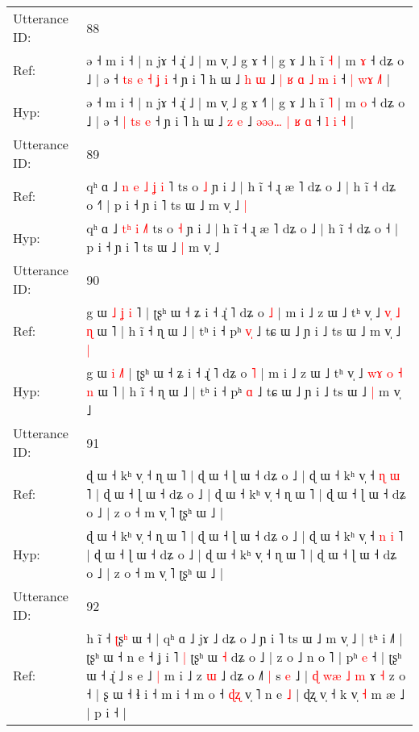 \documentclass[10pt]{article}
\DeclareRobustCommand{\hl}[1]{{\textcolor{red}{#1}}}
\begin{document}
\begin{longtable}{ll}
 \\
\midrule
Utterance ID: & 88 \\
Ref: & ə ˧ m i ˧ | n jɤ ˧ ɻ̍ ˩ | m v̩ ˩ g ɤ ˧\hl{} | g ɤ ˩ h ĩ \hl{˧} | m \hl{ɤ} ˧ dʑ o ˩ | ə ˧\hl{ }\hl{t}\hl{s} \hl{e} \hl{˧}\hl{ }\hl{ʝ} \hl{i} ˧ ɲ i ˥ h ɯ ˩ \hl{h} \hl{ɯ} ˩ \hl{|}\hl{ }\hl{ʁ}\hl{ }\hl{ɑ} \hl{˩} \hl{m} \hl{i} ˧ \hl{|} \hl{w}\hl{ɤ} \hl{˩}\hl{˥} |
 \\
Hyp: & ə ˧ m i ˧ | n jɤ ˧ ɻ̍ ˩ | m v̩ ˩ g ɤ ˧\hl{˥} | g ɤ ˩ h ĩ \hl{˥} | m \hl{o} ˧ dʑ o ˩ | ə ˧\hl{}\hl{}\hl{} \hl{|} \hl{}\hl{t}\hl{s} \hl{e} ˧ ɲ i ˥ h ɯ ˩ \hl{z} \hl{e} ˩ \hl{}\hl{ə}\hl{ə}\hl{ə}\hl{…} \hl{|} \hl{ʁ} \hl{ɑ} ˧ \hl{l} \hl{}\hl{i} \hl{}\hl{˧} |
 \\
\midrule
Utterance ID: & 89 \\
Ref: & qʰ ɑ ˩\hl{ }\hl{n} \hl{e}\hl{ }\hl{˩} \hl{ʝ} \hl{i}\hl{ }˥ ts o \hl{˩} ɲ i ˩ | h ĩ ˧ ɻ æ ˥ dʑ o ˩ | h ĩ ˧ dʑ o ˧\hl{˥} | p i ˧ ɲ i ˥ ts ɯ ˩\hl{}\hl{} m v̩ ˩\hl{ }\hl{|}
 \\
Hyp: & qʰ ɑ ˩\hl{}\hl{} \hl{}\hl{t}\hl{ʰ} \hl{i} \hl{}\hl{˩}˥ ts o \hl{˧} ɲ i ˩ | h ĩ ˧ ɻ æ ˥ dʑ o ˩ | h ĩ ˧ dʑ o ˧\hl{} | p i ˧ ɲ i ˥ ts ɯ ˩\hl{ }\hl{|} m v̩ ˩\hl{}\hl{}
 \\
\midrule
Utterance ID: & 90 \\
Ref: & g ɯ\hl{ }\hl{˩} \hl{ʝ} \hl{i}\hl{ }˥ | ʈʂʰ ɯ ˧ ʑ i ˧ ɻ̍ ˥ dʑ o \hl{˩} | m i ˩ z ɯ ˩ tʰ v̩ ˩ \hl{}\hl{}\hl{v}\hl{̩} \hl{˩} \hl{ɳ} ɯ ˥ | h ĩ ˧ ɳ ɯ ˩ | tʰ i ˧ pʰ \hl{v}\hl{̩} ˩ tɕ ɯ ˩ ɲ i ˩ ts ɯ ˩\hl{}\hl{} m v̩ ˩\hl{ }\hl{|}
 \\
Hyp: & g ɯ\hl{}\hl{} \hl{i} \hl{}\hl{˩}˥ | ʈʂʰ ɯ ˧ ʑ i ˧ ɻ̍ ˥ dʑ o \hl{˥} | m i ˩ z ɯ ˩ tʰ v̩ ˩ \hl{w}\hl{ɤ}\hl{ }\hl{o} \hl{˧} \hl{n} ɯ ˥ | h ĩ ˧ ɳ ɯ ˩ | tʰ i ˧ pʰ \hl{}\hl{ɑ} ˩ tɕ ɯ ˩ ɲ i ˩ ts ɯ ˩\hl{ }\hl{|} m v̩ ˩\hl{}\hl{}
 \\
\midrule
Utterance ID: & 91 \\
Ref: & ɖ ɯ ˧ kʰ v̩ ˧ ɳ ɯ ˥ | ɖ ɯ ˧ ɭ ɯ ˧ dʑ o ˩ | ɖ ɯ ˧ kʰ v̩ ˧ \hl{ɳ} \hl{ɯ} ˥ | ɖ ɯ ˧ ɭ ɯ ˧ dʑ o ˩ | ɖ ɯ ˧ kʰ v̩ ˧ ɳ ɯ ˥ | ɖ ɯ ˧ ɭ ɯ ˧ dʑ o ˩ | z o ˧ m v̩ ˥ ʈʂʰ ɯ ˩ |
 \\
Hyp: & ɖ ɯ ˧ kʰ v̩ ˧ ɳ ɯ ˥ | ɖ ɯ ˧ ɭ ɯ ˧ dʑ o ˩ | ɖ ɯ ˧ kʰ v̩ ˧ \hl{n} \hl{i} ˥ | ɖ ɯ ˧ ɭ ɯ ˧ dʑ o ˩ | ɖ ɯ ˧ kʰ v̩ ˧ ɳ ɯ ˥ | ɖ ɯ ˧ ɭ ɯ ˧ dʑ o ˩ | z o ˧ m v̩ ˥ ʈʂʰ ɯ ˩ |
 \\
\midrule
Utterance ID: & 92 \\
Ref: & h ĩ ˧ \hl{ʈ}ʂ\hl{ʰ} ɯ ˧ | qʰ ɑ ˩ jɤ ˩ dʑ o ˩ ɲ i ˥ ts ɯ ˩\hl{}\hl{} m v̩ ˩ | tʰ i ˩˥ | ʈʂʰ ɯ ˧ n e ˧ ʝ i ˥\hl{ }\hl{|} ʈʂʰ ɯ \hl{˧} dʑ o ˩ | z o ˩ n o ˥ | pʰ \hl{e} ˧ | ʈʂʰ ɯ ˧ ɻ̍ ˩ \hl{}s e ˩\hl{ }\hl{|} m i ˩ z \hl{ɯ} ˩ dʑ o ˩˥\hl{ }\hl{|} s \hl{e} ˩ |\hl{ }\hl{ɖ}\hl{ }\hl{w}\hl{æ}\hl{ }\hl{˩} \hl{m} ɤ \hl{˧} z o ˧ | ʂ ɯ ˧ ɬ i ˧ m i ˧ m o ˧ \hl{ɖ}\hl{ʐ} v̩ ˥ n\hl{}\hl{}\hl{} e \hl{˩} | ɖʐ v̩ ˧ k v̩ \hl{˧} m æ ˩ | p i ˧ |

\end{longtable}
\end{document}
